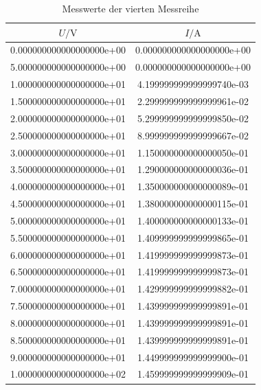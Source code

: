 \begin{table}
  \centering
  \caption{Messwerte der vierten Messreihe}
  \label{tab:Reihe4}
  \begin{tabular}{|S|S|}
    \toprule
    $U/\si{\volt}$ & $I/\si{\ampere}$ \\
    \midrule
    0.000000000000000000e+00 & 0.000000000000000000e+00\\
    5.000000000000000000e+00 & 0.000000000000000000e+00\\
    1.000000000000000000e+01 & 4.199999999999999740e-03\\
    1.500000000000000000e+01 & 2.299999999999999961e-02\\
    2.000000000000000000e+01 & 5.299999999999999850e-02\\
    2.500000000000000000e+01 & 8.999999999999999667e-02\\
    3.000000000000000000e+01 & 1.150000000000000050e-01\\
    3.500000000000000000e+01 & 1.290000000000000036e-01\\
    4.000000000000000000e+01 & 1.350000000000000089e-01\\
    4.500000000000000000e+01 & 1.380000000000000115e-01\\
    5.000000000000000000e+01 & 1.400000000000000133e-01\\
    5.500000000000000000e+01 & 1.409999999999999865e-01\\
    6.000000000000000000e+01 & 1.419999999999999873e-01\\
    6.500000000000000000e+01 & 1.419999999999999873e-01\\
    7.000000000000000000e+01 & 1.429999999999999882e-01\\
    7.500000000000000000e+01 & 1.439999999999999891e-01\\
    8.000000000000000000e+01 & 1.439999999999999891e-01\\
    8.500000000000000000e+01 & 1.439999999999999891e-01\\
    9.000000000000000000e+01 & 1.449999999999999900e-01\\
    1.000000000000000000e+02 & 1.459999999999999909e-01\\
    \bottomrule
  \end{tabular}
\end{table}

